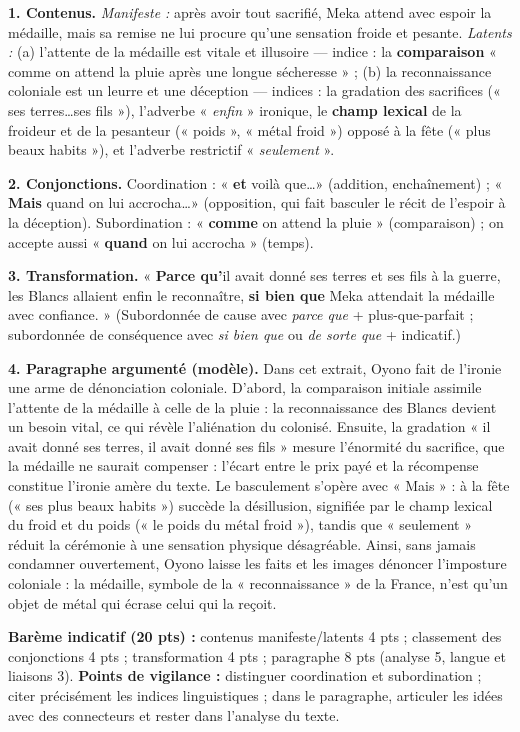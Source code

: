 \documentclass[11pt]{article}
\begin{document}
\begin{corrige}
\textbf{1. Contenus.} \emph{Manifeste :} après avoir tout sacrifié, Meka attend avec espoir la médaille, mais sa remise ne lui procure qu'une sensation froide et pesante. \emph{Latents :} (a) l'attente de la médaille est vitale et illusoire — indice : la \textbf{comparaison} « comme on attend la pluie après une longue sécheresse » ; (b) la reconnaissance coloniale est un leurre et une déception — indices : la gradation des sacrifices (« ses terres\ldots ses fils »), l'adverbe « \emph{enfin} » ironique, le \textbf{champ lexical} de la froideur et de la pesanteur (« poids », « métal froid ») opposé à la fête (« plus beaux habits »), et l'adverbe restrictif « \emph{seulement} ».

\textbf{2. Conjonctions.} Coordination : « \textbf{et} voilà que\ldots » (addition, enchaînement) ; « \textbf{Mais} quand on lui accrocha\ldots » (opposition, qui fait basculer le récit de l'espoir à la déception). Subordination : « \textbf{comme} on attend la pluie » (comparaison) ; on accepte aussi « \textbf{quand} on lui accrocha » (temps).

\textbf{3. Transformation.} « \textbf{Parce qu'}il avait donné ses terres et ses fils à la guerre, les Blancs allaient enfin le reconnaître, \textbf{si bien que} Meka attendait la médaille avec confiance. » (Subordonnée de cause avec \emph{parce que} + plus-que-parfait ; subordonnée de conséquence avec \emph{si bien que} ou \emph{de sorte que} + indicatif.)

\textbf{4. Paragraphe argumenté (modèle).} Dans cet extrait, Oyono fait de l'ironie une arme de dénonciation coloniale. D'abord, la comparaison initiale assimile l'attente de la médaille à celle de la pluie : la reconnaissance des Blancs devient un besoin vital, ce qui révèle l'aliénation du colonisé. Ensuite, la gradation « il avait donné ses terres, il avait donné ses fils » mesure l'énormité du sacrifice, que la médaille ne saurait compenser : l'écart entre le prix payé et la récompense constitue l'ironie amère du texte. Le basculement s'opère avec « Mais » : à la fête (« ses plus beaux habits ») succède la désillusion, signifiée par le champ lexical du froid et du poids (« le poids du métal froid »), tandis que « seulement » réduit la cérémonie à une sensation physique désagréable. Ainsi, sans jamais condamner ouvertement, Oyono laisse les faits et les images dénoncer l'imposture coloniale : la médaille, symbole de la « reconnaissance » de la France, n'est qu'un objet de métal qui écrase celui qui la reçoit.

\textbf{Barème indicatif (20 pts) :} contenus manifeste/latents 4 pts ; classement des conjonctions 4 pts ; transformation 4 pts ; paragraphe 8 pts (analyse 5, langue et liaisons 3). \textbf{Points de vigilance :} distinguer coordination et subordination ; citer précisément les indices linguistiques ; dans le paragraphe, articuler les idées avec des connecteurs et rester dans l'analyse du texte.
\end{corrige}
\end{document}
